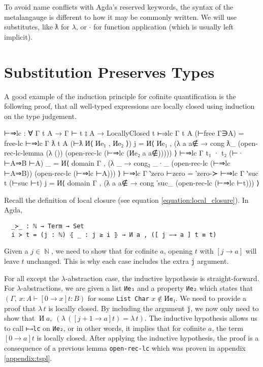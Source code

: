 \documentclass[logo,bsc,singlespacing,parskip,online]{infthesis}
\DeclareMathOperator{\nat}{\mathbb{N}}
\DeclareMathOperator{\cof}{\text{И}}
\renewenvironment{code}{\mintedcopy[breaklines,breaksymbolleft=\;]{agda}}{\endmintedcopy}
\begin{document}
To avoid name conflicts with Agda's reserved keywords, the syntax of the metalangauge is different
to how it may be commonly written. We will use substitutes, like ƛ for $\lambda$, or $\cdot$ for
function application (which is usually left implicit).

\section{Substitution Preserves Types}
A good example of the induction principle for cofinite quantification is the following proof, that
all well-typed expressions are locally closed using induction on the type judgement.

\begin{code}
  ⊢⇒lc : ∀ {Γ t A} → Γ ⊢ t ⦂ A → LocallyClosed t
  ⊢⇒lc {Γ} {t} {A} (⊢free Γ∋A) = free-lc
  ⊢⇒lc {Γ} {ƛ t} {A} (⊢ƛ И⟨ Иe₁ , Иe₂ ⟩) j =
    И⟨ Иe₁ , (λ a {a∉} → cong ƛ_
      (open-rec-lc-lemma
        (λ ())
        (open-rec-lc (⊢⇒lc (Иe₂ a {a∉}))))) ⟩
  ⊢⇒lc {Γ} {t₁ · t₂} (⊢· ⊢A⇒B ⊢A) _ =
    И⟨ domain Γ , (λ _ → cong₂ _·_
      (open-rec-lc (⊢⇒lc ⊢A⇒B)) (open-rec-lc (⊢⇒lc ⊢A))) ⟩
  ⊢⇒lc {Γ} {‵zero} ⊢zero = ‵zero-≻
  ⊢⇒lc {Γ} {‵suc t} (⊢suc ⊢t) j =
    И⟨ domain Γ , (λ a {a∉} →
      cong ‵suc_ (open-rec-lc (⊢⇒lc ⊢t))) ⟩
\end{code}

Recall the definition of local closure (see equation \ref{equation:local_closure}). In Agda,
\begin{verbatim}
  _≻_ : ℕ → Term → Set
  i ≻ t = (j : ℕ) ⦃ _ : j ≥ i ⦄ → И a , ([ j —→ a ] t ≡ t)
\end{verbatim}
Given a $j \in \nat$, we need to show that for cofinite $a$, opening $t$ with $[j \to a]$ will leave
$t$ unchanged. This is why each case includes the extra \texttt{j} argument.

For all except the $\lambda$-abstraction case, the inductive hypothesis is straight-forward. For
$\lambda$-abstractions, we are given a list \texttt{Иe₁} and a property \texttt{Иe₂} which states
that $(\Gamma , \, x \colon A \vdash [0 \to x] t \colon B)$ for some \texttt{List Char} $x \not \in
\texttt{Иe₁}$. We need to provide a proof that $\lambda \, t$ is locally closed. By including the
argument \texttt{j}, we now only need to show that $\cof a, \; (\lambda \, ([j + 1 \to a] t) =
\lambda \, t)$. The inductive hypothesis allows us to call \texttt{⊢⇒lc} on \texttt{Иe₂}, or in
other words, it implies that for cofinite $a$, the term $[0 \to a] t$ is locally closed. After
applying the inductive hypothesis, the proof is a consequence of a previous lemma
\texttt{open-rec-lc} which was proven in appendix \ref{appendix:tspl}.
\end{document}
